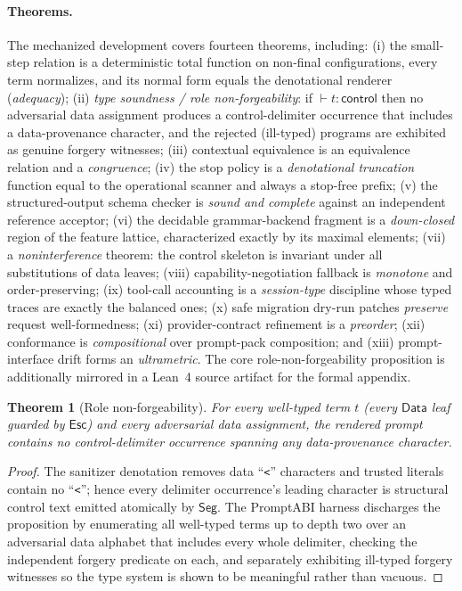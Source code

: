 \documentclass[10pt]{article}
\newtheorem{theorem}{Theorem}
\begin{document}
\paragraph{Theorems.}
The mechanized development covers fourteen theorems, including:
(i) the small-step relation is a deterministic total function on non-final
configurations, every term normalizes, and its normal form equals the
denotational renderer (\emph{adequacy});
(ii) \emph{type soundness / role non-forgeability}: if $\vdash t : \mathsf{control}$
then no adversarial data assignment produces a control-delimiter occurrence that
includes a data-provenance character, and the rejected (ill-typed) programs are
exhibited as genuine forgery witnesses;
(iii) contextual equivalence is an equivalence relation and a \emph{congruence};
(iv) the stop policy is a \emph{denotational truncation} function equal to the
operational scanner and always a stop-free prefix;
(v) the structured-output schema checker is \emph{sound and complete} against an
independent reference acceptor;
(vi) the decidable grammar-backend fragment is a \emph{down-closed} region of the
feature lattice, characterized exactly by its maximal elements;
(vii) a \emph{noninterference} theorem: the control skeleton is invariant under
all substitutions of data leaves;
(viii) capability-negotiation fallback is \emph{monotone} and order-preserving;
(ix) tool-call accounting is a \emph{session-type} discipline whose typed traces
are exactly the balanced ones;
(x) safe migration dry-run patches \emph{preserve} request well-formedness;
(xi) provider-contract refinement is a \emph{preorder};
(xii) conformance is \emph{compositional} over prompt-pack composition; and
(xiii) prompt-interface drift forms an \emph{ultrametric}. The core
role-non-forgeability proposition is additionally mirrored in a Lean~4 source
artifact for the formal appendix.

\begin{theorem}[Role non-forgeability]
For every well-typed term $t$ (every $\mathsf{Data}$ leaf guarded by
$\mathsf{Esc}$) and every adversarial data assignment, the rendered prompt
contains no control-delimiter occurrence spanning any data-provenance character.
\end{theorem}
\begin{proof}
The sanitizer denotation removes data ``\texttt{<}'' characters and trusted
literals contain no ``\texttt{<}''; hence every delimiter occurrence's leading
character is structural control text emitted atomically by $\mathsf{Seg}$. The
PromptABI harness discharges the proposition by enumerating all well-typed terms
up to depth two over an adversarial data alphabet that includes every whole
delimiter, checking the independent forgery predicate on each, and separately
exhibiting ill-typed forgery witnesses so the type system is shown to be
meaningful rather than vacuous.
\end{proof}
\end{document}
